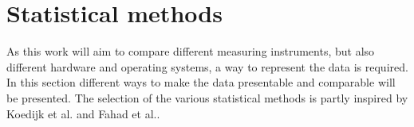 \section{Statistical methods}\label{sec:stat}

As this work will aim to compare different measuring instruments, but also different hardware and operating systems, a way to represent the data is required. In this section different ways to make the data presentable and comparable will be presented. The selection of the various statistical methods is partly inspired by Koedijk et al.\cite{Koedijk2022diff} and Fahad et al.\cite{fahad2019comparative}.




